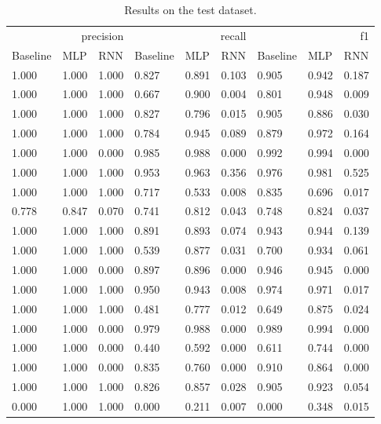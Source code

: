 \begin{table}
\caption{Results on the test dataset.}
\label{tab::ex_2_test}
\begin{tabular}{|l||l||l||l||l||l||l||l||l|}
\toprule
\multicolumn{3}{r}{precision} & \multicolumn{3}{r}{recall} & \multicolumn{3}{r}{f1} \\
Baseline & MLP & RNN & Baseline & MLP & RNN & Baseline & MLP & RNN \\
\midrule
1.000 & 1.000 & 1.000 & 0.827 & 0.891 & 0.103 & 0.905 & 0.942 & 0.187 \\
1.000 & 1.000 & 1.000 & 0.667 & 0.900 & 0.004 & 0.801 & 0.948 & 0.009 \\
1.000 & 1.000 & 1.000 & 0.827 & 0.796 & 0.015 & 0.905 & 0.886 & 0.030 \\
1.000 & 1.000 & 1.000 & 0.784 & 0.945 & 0.089 & 0.879 & 0.972 & 0.164 \\
1.000 & 1.000 & 0.000 & 0.985 & 0.988 & 0.000 & 0.992 & 0.994 & 0.000 \\
1.000 & 1.000 & 1.000 & 0.953 & 0.963 & 0.356 & 0.976 & 0.981 & 0.525 \\
1.000 & 1.000 & 1.000 & 0.717 & 0.533 & 0.008 & 0.835 & 0.696 & 0.017 \\
0.778 & 0.847 & 0.070 & 0.741 & 0.812 & 0.043 & 0.748 & 0.824 & 0.037 \\
1.000 & 1.000 & 1.000 & 0.891 & 0.893 & 0.074 & 0.943 & 0.944 & 0.139 \\
1.000 & 1.000 & 1.000 & 0.539 & 0.877 & 0.031 & 0.700 & 0.934 & 0.061 \\
1.000 & 1.000 & 0.000 & 0.897 & 0.896 & 0.000 & 0.946 & 0.945 & 0.000 \\
1.000 & 1.000 & 1.000 & 0.950 & 0.943 & 0.008 & 0.974 & 0.971 & 0.017 \\
1.000 & 1.000 & 1.000 & 0.481 & 0.777 & 0.012 & 0.649 & 0.875 & 0.024 \\
1.000 & 1.000 & 0.000 & 0.979 & 0.988 & 0.000 & 0.989 & 0.994 & 0.000 \\
1.000 & 1.000 & 0.000 & 0.440 & 0.592 & 0.000 & 0.611 & 0.744 & 0.000 \\
1.000 & 1.000 & 0.000 & 0.835 & 0.760 & 0.000 & 0.910 & 0.864 & 0.000 \\
1.000 & 1.000 & 1.000 & 0.826 & 0.857 & 0.028 & 0.905 & 0.923 & 0.054 \\
0.000 & 1.000 & 1.000 & 0.000 & 0.211 & 0.007 & 0.000 & 0.348 & 0.015 \\
\bottomrule
\end{tabular}
\end{table}
